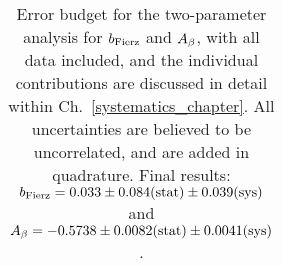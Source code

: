 \begin{table}[h!!!!t]
\begin{center}
\begin{tabular}{ l  c  c  }
	\end{tabular}
	\end{center}
	\caption[Error Budget]{Error budget for the two-parameter analysis for $b_{\mathrm{Fierz}}$ and $A_{\beta}$, with all data included, and the individual contributions are discussed in detail within Ch.~\ref{systematics_chapter}.  All uncertainties are believed to be uncorrelated, and are added in quadrature.  Final results: 
	$\mbox{ $b_{\mathrm{Fierz}} = 0.033 \pm 0.084(\textrm{stat}) \pm 0.039(\textrm{sys})$ }$ and $\mbox{ $A_{\beta} = -0.5738 \pm 0.0082(\textrm{stat}) \pm 0.0041(\textrm{sys})$ }$. }
	\label{table:budget}
\end{table}




